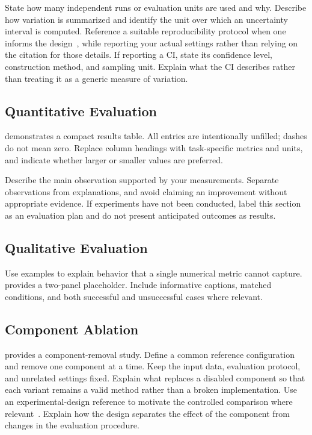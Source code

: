State how many independent runs or evaluation units are used and why.
Describe how variation is summarized and identify the unit over which an
uncertainty interval is computed. Reference a suitable reproducibility
protocol when one informs the design~\cite{reproducibility}, while reporting
your actual settings rather than relying on the citation for those details.
If reporting a \ac{CI}, state its confidence level, construction method,
and sampling unit. Explain what the \ac{CI} describes rather than treating
it as a generic measure of variation.

\subsection{Quantitative Evaluation}
 demonstrates a compact results table.
All entries are intentionally unfilled; dashes do not mean zero.
Replace column headings with task-specific metrics and units, and indicate
whether larger or smaller values are preferred.



Describe the main observation supported by your measurements. Separate
observations from explanations, and avoid claiming an improvement without
appropriate evidence. If experiments have not been conducted, label this
section as an evaluation plan and do not present anticipated outcomes as results.

\subsection{Qualitative Evaluation}
Use examples to explain behavior that a single numerical metric cannot
capture.  provides a two-panel placeholder.
Include informative captions, matched conditions, and both successful and
unsuccessful cases where relevant.



\subsection{Component Ablation}
 provides a component-removal study.
Define a common reference configuration and remove one component at a
time. Keep the input data, evaluation protocol, and unrelated settings
fixed. Explain what replaces a disabled component so that each variant
remains a valid method rather than a broken implementation.
Use an experimental-design reference to motivate the controlled comparison
where relevant~\cite{ablation}. Explain how the design separates the effect
of the component from changes in the evaluation procedure.

